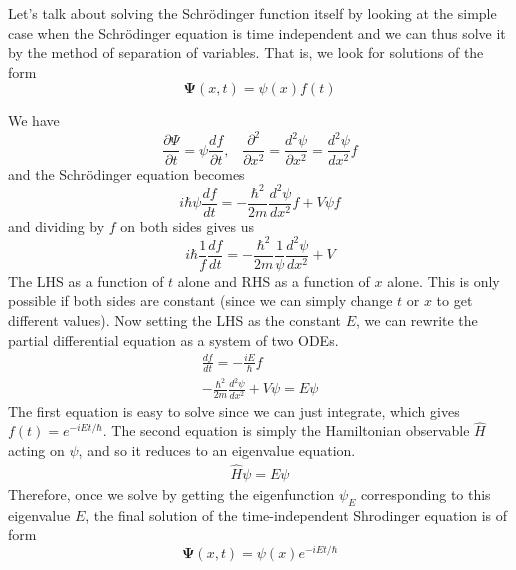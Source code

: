 \documentclass{article}
\begin{document}
  

  Let's talk about solving the Schr\"odinger function itself by looking at the simple case when the Schr\"odinger equation is time independent and we can thus solve it by the method of separation of variables. That is, we look for solutions of the form 
  \begin{equation} 
    \boldsymbol{\Psi}(x, t) = \psi(x) f(t)
  \end{equation}

  We have 
  \begin{equation} 
    \frac{\partial \Psi}{\partial t} = \psi \frac{d f}{\partial t} , \;\;\; \frac{\partial^2}{\partial x^2} = \frac{d^2 \psi}{\partial x^2} = \frac{d^2 \psi}{d x^2} f
  \end{equation}
  and the Schr\"odinger equation becomes 
  \begin{equation} 
    i \hbar \psi \frac{d f}{d t} = -\frac{\hbar^2}{2m}\frac{d^2 \psi}{d x^2} f + V \psi f
  \end{equation}
  and dividing by $f$ on both sides gives us 
  \begin{equation} 
    i \hbar \frac{1}{f} \frac{df}{dt} = -\frac{\hbar^2}{2m} \frac{1}{\psi} \frac{d^2 \psi}{d x^2} + V
  \end{equation}
  The LHS as a function of $t$ alone and RHS as a function of $x$ alone. This is only possible if both sides are constant (since we can simply change $t$ or $x$ to get different values). Now setting the LHS as the constant $E$, we can rewrite the partial differential equation as a system of two ODEs. 
  \begin{align} 
    \frac{df}{dt} = - \frac{i E}{\hbar} f \\
    - \frac{\hbar^2}{2m} \frac{d^2 \psi}{dx^2} + V \psi = E \psi
  \end{align}
  The first equation is easy to solve since we can just integrate, which gives $f(t) = e^{-i E t/ \hbar}$. The second equation is simply the Hamiltonian observable $\hat{H}$ acting on $\psi$, and so it reduces to an eigenvalue equation.  
  \begin{align} 
    \hat{H} \psi = E \psi
  \end{align}
  Therefore, once we solve by getting the eigenfunction $\psi_E$ corresponding to this eigenvalue $E$, the final solution of the time-independent Shrodinger equation is of form 
  \begin{equation} 
    \boldsymbol{\Psi}(x, t) = \psi(x) e^{-i E t/\hbar}  
  \end{equation}
\end{document}
